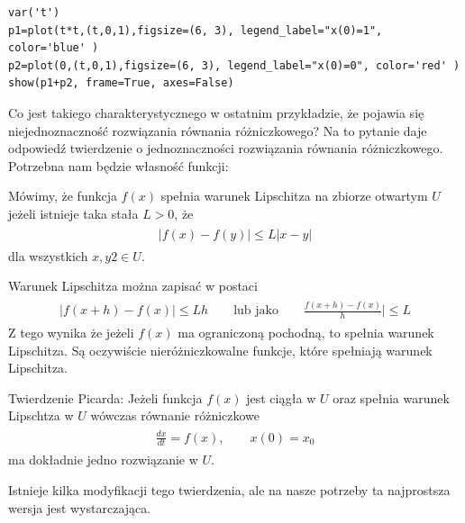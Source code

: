 \documentclass[a4paper,12pt,polish]{sphinxmanual}
\begin{document}
\begin{verbatim}
var('t')
p1=plot(t*t,(t,0,1),figsize=(6, 3), legend_label="x(0)=1", color='blue' )
p2=plot(0,(t,0,1),figsize=(6, 3), legend_label="x(0)=0", color='red' )
show(p1+p2, frame=True, axes=False)
\end{verbatim}


Co jest takiego charakterystycznego w ostatnim przykładzie, że pojawia się niejednoznaczność rozwiązania równania różniczkowego?  Na to pytanie daje odpowiedź  twierdzenie o jednoznaczności rozwiązania równania różniczkowego. Potrzebna nam będzie własność funkcji:

Mówimy, że funkcja $f(x)$ spełnia  warunek Lipschitza na zbiorze otwartym $U$ jeżeli istnieje taka stała $L > 0$,  że
\label{ch1/chI021:equation-eqn15}\begin{gather}
\begin{split}|f(x) -f(y)| \le L|x- y|\end{split}\label{ch1/chI021-eqn15}
\end{gather}
dla wszystkich $x, y2 \in U$.

Warunek Lipschitza można zapisać w postaci
\label{ch1/chI021:equation-eqn16}\begin{gather}
\begin{split}|f(x+h) -f(x)| \le L h \quad \quad \mbox{lub jako} \quad \quad \frac{f(x+h) - f(x)}{h}| \le L\end{split}\label{ch1/chI021-eqn16}
\end{gather}
Z tego wynika że jeżeli  $f(x)$ ma ograniczoną pochodną, to spełnia warunek Lipschitza. Są  oczywiście nieróżniczkowalne funkcje, które spełniają warunek Lipschitza.

Twierdzenie Picarda: Jeżeli funkcja $f(x)$ jest ciągła w $U$ oraz spełnia warunek Lipschtza w  $U$ wówczas równanie różniczkowe
\label{ch1/chI021:equation-eqn17}\begin{gather}
\begin{split}\frac{dx}{dt} = f(x), \qquad x(0) = x_0\end{split}\label{ch1/chI021-eqn17}
\end{gather}
ma dokładnie jedno rozwiązanie w $U$.

Istnieje kilka  modyfikacji tego twierdzenia, ale na nasze potrzeby ta najprostsza wersja jest wystarczająca.
\end{document}
